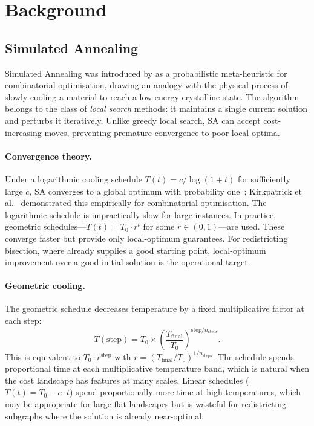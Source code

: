 \section{Background}
\label{sec:background}

\subsection{Simulated Annealing}

Simulated Annealing was introduced by \citet{kirkpatrick1983} as a
probabilistic meta-heuristic for combinatorial optimisation, drawing an
analogy with the physical process of slowly cooling a material to reach
a low-energy crystalline state.
The algorithm belongs to the class of \emph{local search} methods: it
maintains a single current solution and perturbs it iteratively.
Unlike greedy local search, SA can accept cost-increasing moves, preventing
premature convergence to poor local optima.

\paragraph{Convergence theory.}
Under a logarithmic cooling schedule $T(t) = c / \log(1+t)$ for sufficiently
large $c$, SA converges to a global optimum with probability
one~\citep{hajek1988}; Kirkpatrick et al.\ \citeyear{kirkpatrick1983}
demonstrated this empirically for combinatorial optimisation.
The logarithmic schedule is impractically slow for large instances.
In practice, geometric schedules---$T(t) = T_0 \cdot r^t$ for some
$r \in (0,1)$---are used.
These converge faster but provide only local-optimum guarantees.
For redistricting bisection, where \metis{} already supplies a good
starting point, local-optimum improvement over a good initial solution
is the operational target.

\paragraph{Geometric cooling.}
The geometric schedule decreases temperature by a fixed multiplicative
factor at each step:
\[
  T(\mathrm{step}) = T_0 \times \left(\frac{T_{\mathrm{final}}}{T_0}\right)^{\mathrm{step}/n_{\mathrm{steps}}}.
\]
This is equivalent to $T_0 \cdot r^{\mathrm{step}}$ with
$r = (T_{\mathrm{final}}/T_0)^{1/n_{\mathrm{steps}}}$.
The schedule spends proportional time at each multiplicative temperature
band, which is natural when the cost landscape has features at many scales.
Linear schedules ($T(t) = T_0 - c \cdot t$) spend proportionally more
time at high temperatures, which may be appropriate for large flat landscapes
but is wasteful for redistricting subgraphs where the \metis{} solution is
already near-optimal.

